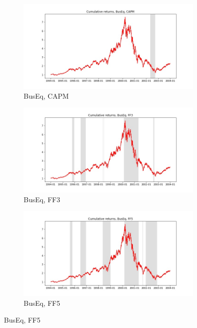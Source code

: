 \documentclass{article}
\begin{document}
 \begin{figure}
  \centering
  \begin{subfigure}[b]{0.3\textwidth}
    \centering
    \includegraphics[width=\textwidth]{BusEq/full_cumrets_ofint_CAPM.jpg}
    \caption{BusEq, CAPM}
    \label{fig:1}
  \end{subfigure}
  \begin{subfigure}[b]{0.3\textwidth}
    \centering
    \includegraphics[width=\textwidth]{BusEq/full_cumrets_ofint_FF3.jpg}
    \caption{BusEq, FF3}
    \label{fig:2}
  \end{subfigure}
    \begin{subfigure}[b]{0.3\textwidth}
    \centering
    \includegraphics[width=\textwidth]{BusEq/full_cumrets_ofint_FF5.jpg}
    \caption{BusEq, FF5}
    \label{fig:1}
  \end{subfigure}
  \end{figure}
\end{document}
